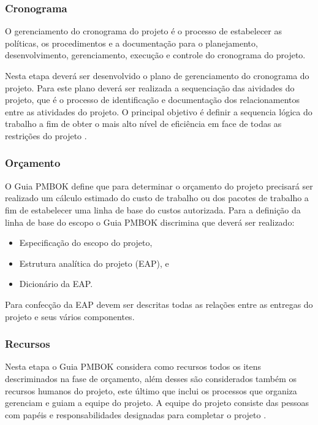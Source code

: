 \documentclass{acm_proc_article-sp}
\begin{document}
\subsubsection*{Cronograma}
O gerenciamento do cronograma do projeto é o processo de estabelecer as políticas, os procedimentos e a documentação para o planejamento, desenvolvimento, gerenciamento, execução e controle do cronograma do projeto.

Nesta etapa deverá ser desenvolvido o plano de gerenciamento do cronograma do projeto. Para este plano deverá ser realizada a sequenciação das aividades do projeto, que é o processo de identificação e documentação dos relacionamentos entre as atividades do projeto. O principal objetivo é definir a sequencia lógica do trabalho a fim de obter o mais alto nível de eficiência em face de todas as restrições do projeto \cite{pmbok:nAgil}.

\subsubsection*{Orçamento}
O Guia PMBOK  define que para determinar o orçamento do projeto precisará ser realizado um cálculo estimado do custo de trabalho ou dos pacotes de trabalho a fim de estabelecer uma linha de base do custos autorizada. Para a definição da linha de base do escopo o Guia PMBOK discrimina que deverá ser realizado:

\begin{itemize}
\item Especificação do escopo do projeto,
\item Estrutura analítica do projeto (EAP), e
\item Dicionário da EAP.
\end{itemize}

Para confecção da EAP devem ser descritas todas as relações entre as entregas do projeto e seus vários componentes.

\subsubsection*{Recursos}
Nesta etapa o Guia PMBOK considera como recursos todos os itens descriminados na fase de orçamento, além desses são considerados também os recursos humanos do projeto, este último que inclui os processos que organiza gerenciam e guiam a equipe do projeto. A equipe do projeto consiste das pessoas com papéis e responsabilidades designadas para completar o projeto \cite{pmbok:nAgil}.
\end{document}

